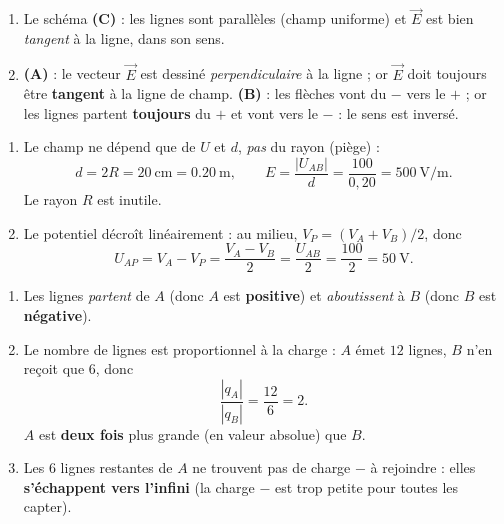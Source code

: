 \documentclass[11pt,a4paper]{article}
\newcommand{\vv}[1]{\vec{#1}}\newcommand{\ds}{\displaystyle}
\begin{document}

\begin{corrige}
\begin{enumerate}[label=\alph*)]
  \item Le schéma \textbf{(C)} : les lignes sont parallèles (champ uniforme) et $\vv{E}$ est bien
        \emph{tangent} à la ligne, dans son sens.
  \item \textbf{(A)} : le vecteur $\vv{E}$ est dessiné \emph{perpendiculaire} à la ligne ; or $\vv{E}$
        doit toujours être \textbf{tangent} à la ligne de champ. \textbf{(B)} : les flèches vont du
        $-$ vers le $+$ ; or les lignes partent \textbf{toujours} du $+$ et vont vers le $-$ : le
        sens est inversé.
\end{enumerate}
\end{corrige}

\begin{corrige}
\begin{enumerate}[label=\alph*)]
  \item Le champ ne dépend que de $U$ et $d$, \emph{pas} du rayon (piège) :
        \[ d = 2R = \SI{20}{\centi\metre} = \SI{0.20}{\metre},\qquad
           E = \frac{|U_{AB}|}{d} = \frac{100}{0{,}20} = \SI{500}{\volt\per\metre}. \]
        Le rayon $R$ est inutile.
  \item Le potentiel décroît linéairement : au milieu, $V_P = (V_A+V_B)/2$, donc
        \[ U_{AP} = V_A - V_P = \frac{V_A - V_B}{2} = \frac{U_{AB}}{2} = \frac{100}{2} = \SI{50}{\volt}. \]
\end{enumerate}
\end{corrige}

\begin{corrige}
\begin{enumerate}[label=\alph*)]
  \item Les lignes \emph{partent} de $A$ (donc $A$ est \textbf{positive}) et \emph{aboutissent} à
        $B$ (donc $B$ est \textbf{négative}).
  \item Le nombre de lignes est proportionnel à la charge : $A$ émet $12$ lignes, $B$ n'en reçoit
        que $6$, donc
        \[ \frac{|q_A|}{|q_B|} = \frac{12}{6} = 2. \]
        $A$ est \textbf{deux fois} plus grande (en valeur absolue) que $B$.
  \item Les $6$ lignes restantes de $A$ ne trouvent pas de charge $-$ à rejoindre : elles
        \textbf{s'échappent vers l'infini} (la charge $-$ est trop petite pour toutes les capter).
\end{enumerate}
\end{corrige}
\end{document}
